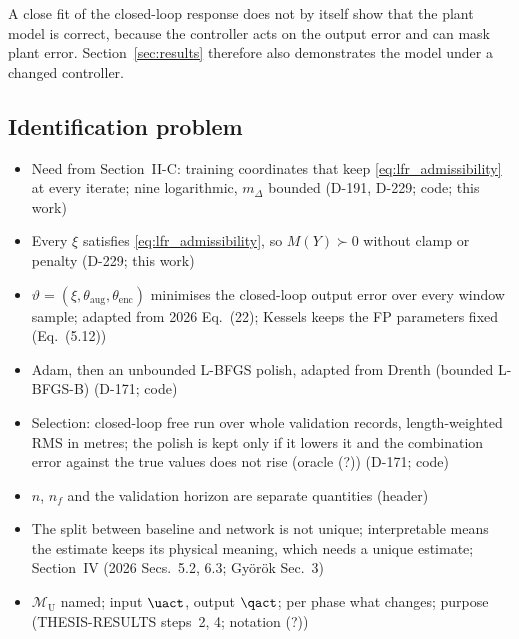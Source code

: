 A close fit of the closed-loop response does not by itself show that the
plant model is correct, because the controller acts on the output error and
can mask plant error.
Section~\ref{sec:results} therefore also demonstrates the model under a changed
controller.

\subsection{Identification problem}\label{sec:aug_closed_loop}
\ifdraft
\begin{itemize}
\item Need from Section~II-C: training coordinates that keep \eqref{eq:lfr_admissibility} at every iterate; nine logarithmic, $m_\Delta$ bounded (D-191, D-229; code; this work)
\item Every $\xi$ satisfies \eqref{eq:lfr_admissibility}, so $M(Y)\succ0$ without clamp or penalty (D-229; this work)
\item $\vartheta=(\xi,\theta_{\mathrm{aug}},\theta_{\mathrm{enc}})$ minimises the closed-loop output error over every window sample; adapted from 2026 Eq.~(22); Kessels keeps the FP parameters fixed (Eq.~(5.12))
\item Adam, then an unbounded L-BFGS polish, adapted from Drenth (bounded L-BFGS-B) (D-171; code)
\item Selection: closed-loop free run over whole validation records, length-weighted RMS in metres; the polish is kept only if it lowers it and the combination error against the true values does not rise (oracle (?)) (D-171; code)
\item $n$, $n_f$ and the validation horizon are separate quantities (header)
\item The split between baseline and network is not unique; interpretable means the estimate keeps its physical meaning, which needs a unique estimate; Section~IV (2026 Secs.~5.2, 6.3; Gy\"or\"ok Sec.~3)
\item $\mathcal M_{\mathrm U}$ named; input $\uact$, output $\qact$; per phase what changes; purpose (THESIS-RESULTS steps~2, 4; notation (?))
\end{itemize}
\fi

